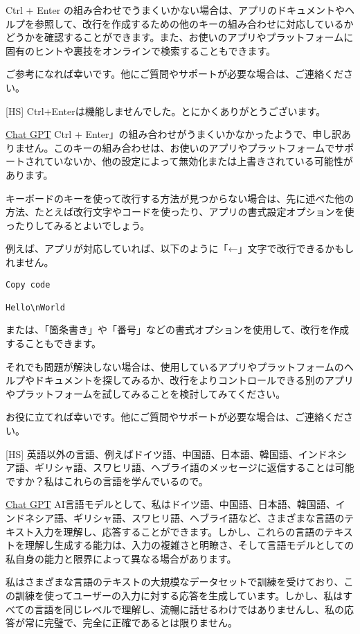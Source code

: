 \documentclass[
]{book}
\theoremstyle{definition}
\theoremstyle{definition}
\theoremstyle{definition}
\theoremstyle{definition}
\theoremstyle{remark}
\begin{document}
Ctrl + Enter の組み合わせでうまくいかない場合は、アプリのドキュメントやヘルプを参照して、改行を作成するための他のキーの組み合わせに対応しているかどうかを確認することができます。また、お使いのアプリやプラットフォームに固有のヒントや裏技をオンラインで検索することもできます。

ご参考になれば幸いです。他にご質問やサポートが必要な場合は、ご連絡ください。

{[}HS{]} Ctrl+Enterは機能しませんでした。とにかくありがとうございます。

\protect\hyperlink{chatgpt}{Chat GPT} Ctrl + Enter」の組み合わせがうまくいかなかったようで、申し訳ありません。このキーの組み合わせは、お使いのアプリやプラットフォームでサポートされていないか、他の設定によって無効化または上書きされている可能性があります。

キーボードのキーを使って改行する方法が見つからない場合は、先に述べた他の方法、たとえば改行文字やコードを使ったり、アプリの書式設定オプションを使ったりしてみるとよいでしょう。

例えば、アプリが対応していれば、以下のように「←」文字で改行できるかもしれません。

\begin{verbatim}
Copy code

Hello\nWorld
\end{verbatim}

または、「箇条書き」や「番号」などの書式オプションを使用して、改行を作成することもできます。

それでも問題が解決しない場合は、使用しているアプリやプラットフォームのヘルプやドキュメントを探してみるか、改行をよりコントロールできる別のアプリやプラットフォームを試してみることを検討してみてください。

お役に立てれば幸いです。他にご質問やサポートが必要な場合は、ご連絡ください。

{[}HS{]} 英語以外の言語、例えばドイツ語、中国語、日本語、韓国語、インドネシア語、ギリシャ語、スワヒリ語、ヘブライ語のメッセージに返信することは可能ですか？私はこれらの言語を学んでいるので。

\protect\hyperlink{chatgpt}{Chat GPT} AI言語モデルとして、私はドイツ語、中国語、日本語、韓国語、インドネシア語、ギリシャ語、スワヒリ語、ヘブライ語など、さまざまな言語のテキスト入力を理解し、応答することができます。しかし、これらの言語のテキストを理解し生成する能力は、入力の複雑さと明瞭さ、そして言語モデルとしての私自身の能力と限界によって異なる場合があります。

私はさまざまな言語のテキストの大規模なデータセットで訓練を受けており、この訓練を使ってユーザーの入力に対する応答を生成しています。しかし、私はすべての言語を同じレベルで理解し、流暢に話せるわけではありませんし、私の応答が常に完璧で、完全に正確であるとは限りません。
\end{document}

